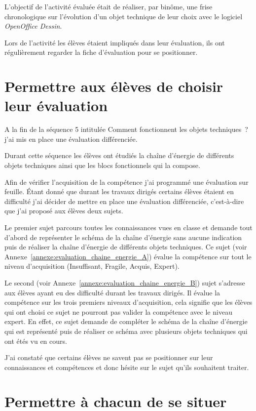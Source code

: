 L'objectif de l'activité évaluée était de réaliser, par binôme, une frise chronologique sur l'évolution d'un objet technique de leur choix avec le logiciel \textit{OpenOffice Dessin}.

Lors de l'activité les élèves étaient impliqués dans leur évaluation, ils ont régulièrement regarder la fiche d'évaluation pour se positionner.

\newpage
\section{Permettre aux élèves de choisir leur évaluation}

A la fin de la séquence 5 intitulée \og Comment fonctionnent les objets techniques~?\fg j'ai mis en place une évaluation différenciée.

Durant cette séquence les élèves ont étudiés la chaîne d'énergie de différents objets techniques ainsi que les blocs fonctionnels qui la compose.

Afin de vérifier l'acquisition de la compétence j'ai programmé une évaluation sur feuille.
Étant donné que durant les travaux dirigés certains élèves étaient en difficulté j'ai décider de mettre en place une évaluation différenciée, c'est-à-dire que j'ai proposé aux élèves deux sujets.

Le premier sujet parcours toutes les connaissances vues en classe et demande tout d'abord de représenter le schéma de la chaîne d'énergie sans aucune indication puis de réaliser la chaîne d'énergie de différents objets techniques.
Ce sujet (voir Annexe~\ref{annexe:evaluation_chaine_energie_A}) évalue la compétence sur tout le niveau d'acquisition (Insuffisant, Fragile, Acquis, Expert).

Le second (voir Annexe~\ref{annexe:evaluation_chaine_energie_B}) sujet s'adresse aux élèves ayant eu des difficulté durant les travaux dirigés.
Il évalue la compétence sur les trois premiers niveaux d'acquisition, cela signifie que les élèves qui ont choisi ce sujet ne pourront pas valider la compétence avec le niveau expert.
En effet, ce sujet demande de compléter le schéma de la chaîne d'énergie qui est représenté puis de réaliser ce schéma avec plusieurs objets techniques qui ont étés vu en cours.

J'ai constaté que certains élèves ne savent pas se positionner sur leur connaissances et compétences et donc hésite sur le sujet qu'ils souhaitent traiter.


\newpage
\section{Permettre à chacun de se situer }

